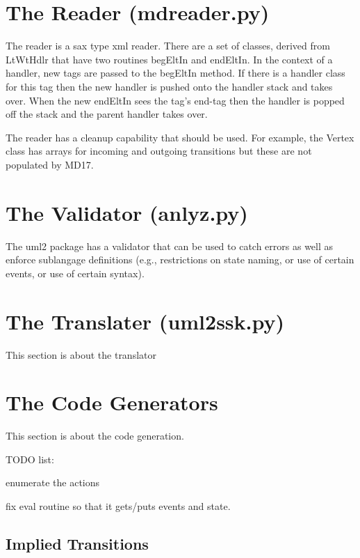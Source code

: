 \documentclass{article}
\begin{document}
\section{The Reader (mdreader.py)}

The reader is a sax type xml reader.  There are a set of classes,
derived from LtWtHdlr that have two routines begEltIn and endEltIn.
In the context of a handler, new tags are passed to the begEltIn method.
If there is a handler class for this tag then the new handler is pushed
onto the handler stack and takes over.  When the new endEltIn sees the
tag's end-tag then the handler is popped off the stack and the parent
handler takes over.

The reader has a cleanup capability that should be used.  For example,
the Vertex class has arrays for incoming and outgoing transitions but
these are not populated by MD17.


\section{The Validator (anlyz.py)}

The uml2 package has a validator that can be used to catch errors as well
as enforce sublangage definitions (e.g., restrictions on state naming, or 
use of certain events, or use of certain syntax).

\section{The Translater (uml2ssk.py)}

This section is about the translator

\section{The Code Generators}

This section is about the code generation.

TODO list:
\begin{enumeration}
\item enumerate the actions 
\item fix eval routine so that it gets/puts events and state.
\end{enumeration}


\subsection{Implied Transitions}
\end{document}
